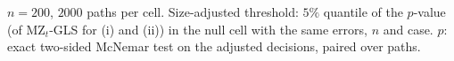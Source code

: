 $n = 200$, $2000$ paths per cell. Size-adjusted threshold: $5\%$ quantile of the $p$-value (of MZ$_t$-GLS for (i) and (ii)) in the null cell with the same errors, $n$ and case. $p$: exact two-sided McNemar test on the adjusted decisions, paired over paths.
